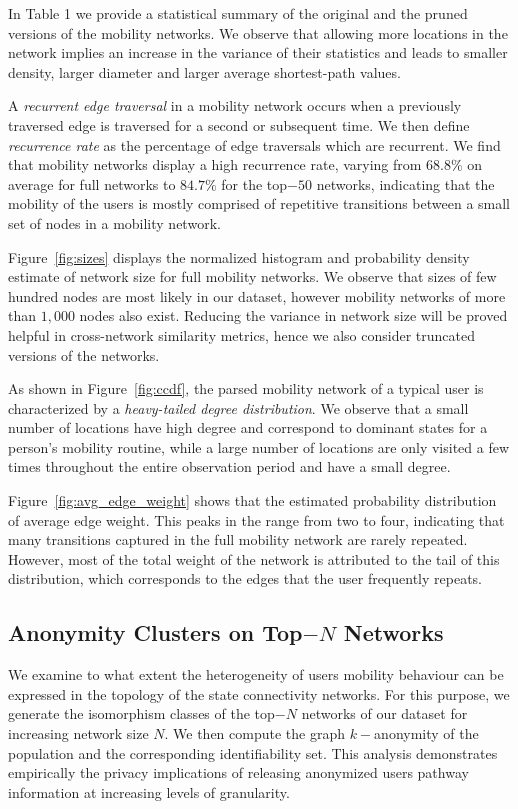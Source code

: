 In Table 1 we provide a statistical summary of the original and the pruned versions of the mobility networks.
We observe that allowing more locations in the network implies an increase in the variance of their statistics and leads to smaller density, larger diameter and larger average shortest-path values.


A \emph{recurrent edge traversal} in a mobility network occurs when a previously traversed edge is traversed for a second or subsequent time.
We then define \emph{recurrence rate} as the percentage of edge traversals which are recurrent.
We find that mobility networks display a high recurrence rate, varying from  $68.8\%$ on average for full networks to $84.7\% $ for the top$-50$ networks, indicating that the mobility of the users is mostly comprised of repetitive transitions between a small set of nodes in a mobility network.

Figure~\ref{fig:sizes} displays the normalized histogram and probability density estimate of network size for full mobility networks.
We observe that sizes of few hundred nodes are most likely in our dataset, however mobility networks of more than $1,000$ nodes also exist.
Reducing the variance in network size will be proved helpful in cross-network similarity metrics, hence we also consider truncated versions of the networks.

As shown in Figure~\ref{fig:ccdf}, the parsed mobility network of a typical user is characterized by a \emph{heavy-tailed degree distribution}. We observe that a small number of locations have high degree and correspond to dominant states for a person's mobility routine, while a large number of locations are only visited a few times throughout the entire observation period and have a small degree.

 Figure~\ref{fig:avg_edge_weight} shows that the estimated probability distribution of average edge weight.
 This peaks in the range from two to four, indicating that many transitions captured in the full mobility network are rarely repeated. However, most of the total weight of the network is attributed to the tail of this distribution, which corresponds to the edges that the user frequently repeats.

\subsection{Anonymity Clusters on Top$-N$  Networks}

We examine to what extent the heterogeneity of users mobility behaviour can be expressed in the topology of the state connectivity networks.
For this purpose, we generate the isomorphism classes of the top$-N$ networks of our dataset for increasing network size $ N $.
We then compute the graph $k-$anonymity of the population and the corresponding identifiability set.
This analysis demonstrates empirically the privacy implications of releasing anonymized users pathway information at increasing levels of granularity.

